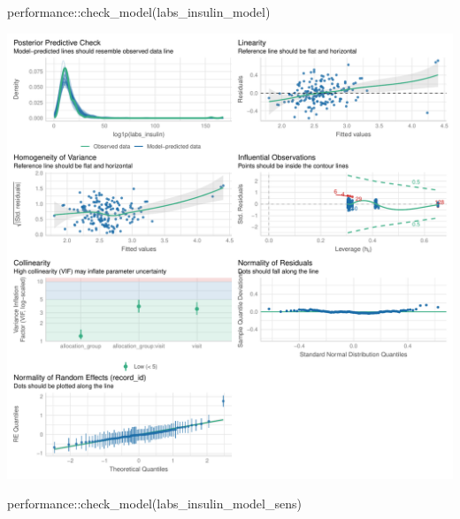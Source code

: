 \documentclass[
  letterpaper,
  DIV=11,
  numbers=noendperiod]{scrartcl}
\newenvironment{Shaded}{\begin{snugshade}}{\end{snugshade}}
\newcommand{\FunctionTok}[1]{\textcolor[rgb]{0.28,0.35,0.67}{#1}}
\newcommand{\NormalTok}[1]{\textcolor[rgb]{0.00,0.23,0.31}{#1}}
\newcommand{\SpecialCharTok}[1]{\textcolor[rgb]{0.37,0.37,0.37}{#1}}
\begin{document}
\begin{Shaded}
\begin{Highlighting}[]
\NormalTok{performance}\SpecialCharTok{::}\FunctionTok{check\_model}\NormalTok{(labs\_insulin\_model)}
\end{Highlighting}
\end{Shaded}

\includegraphics{Outcomes_V1V2V3_files/figure-pdf/labs_insulin_4-1.pdf}

\begin{Shaded}
\begin{Highlighting}[]
\NormalTok{performance}\SpecialCharTok{::}\FunctionTok{check\_model}\NormalTok{(labs\_insulin\_model\_sens)}
\end{Highlighting}
\end{Shaded}
\end{document}

